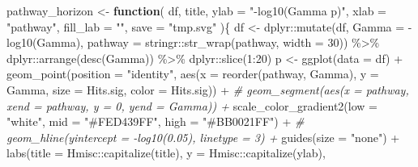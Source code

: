 \documentclass[
]{article}
\newenvironment{Shaded}{\begin{snugshade}}{\end{snugshade}}
\newcommand{\AttributeTok}[1]{\textcolor[rgb]{0.77,0.63,0.00}{#1}}
\newcommand{\CommentTok}[1]{\textcolor[rgb]{0.56,0.35,0.01}{\textit{#1}}}
\newcommand{\ControlFlowTok}[1]{\textcolor[rgb]{0.13,0.29,0.53}{\textbf{#1}}}
\newcommand{\DecValTok}[1]{\textcolor[rgb]{0.00,0.00,0.81}{#1}}
\newcommand{\FunctionTok}[1]{\textcolor[rgb]{0.00,0.00,0.00}{#1}}
\newcommand{\NormalTok}[1]{#1}
\newcommand{\OtherTok}[1]{\textcolor[rgb]{0.56,0.35,0.01}{#1}}
\newcommand{\SpecialCharTok}[1]{\textcolor[rgb]{0.00,0.00,0.00}{#1}}
\newcommand{\StringTok}[1]{\textcolor[rgb]{0.31,0.60,0.02}{#1}}
\begin{document}
\begin{Shaded}
\begin{Highlighting}[]
\NormalTok{pathway\_horizon }\OtherTok{\textless{}{-}} 
  \ControlFlowTok{function}\NormalTok{(}
\NormalTok{           df,}
\NormalTok{           title,}
           \AttributeTok{ylab =} \StringTok{"{-}log10(Gamma p)"}\NormalTok{,}
           \AttributeTok{xlab =} \StringTok{"pathway"}\NormalTok{,}
           \AttributeTok{fill\_lab =} \StringTok{""}\NormalTok{,}
           \AttributeTok{save =} \StringTok{"tmp.svg"}
\NormalTok{           )\{}
\NormalTok{    df }\OtherTok{\textless{}{-}}\NormalTok{ dplyr}\SpecialCharTok{::}\FunctionTok{mutate}\NormalTok{(df, }\AttributeTok{Gamma =} \SpecialCharTok{{-}}\FunctionTok{log10}\NormalTok{(Gamma),}
                        \AttributeTok{pathway =}\NormalTok{ stringr}\SpecialCharTok{::}\FunctionTok{str\_wrap}\NormalTok{(pathway, }\AttributeTok{width =} \DecValTok{30}\NormalTok{)) }\SpecialCharTok{\%\textgreater{}\%} 
\NormalTok{      dplyr}\SpecialCharTok{::}\FunctionTok{arrange}\NormalTok{(}\FunctionTok{desc}\NormalTok{(Gamma)) }\SpecialCharTok{\%\textgreater{}\%} 
\NormalTok{      dplyr}\SpecialCharTok{::}\FunctionTok{slice}\NormalTok{(}\DecValTok{1}\SpecialCharTok{:}\DecValTok{20}\NormalTok{)}
\NormalTok{    p }\OtherTok{\textless{}{-}} \FunctionTok{ggplot}\NormalTok{(}\AttributeTok{data =}\NormalTok{ df) }\SpecialCharTok{+}
      \FunctionTok{geom\_point}\NormalTok{(}\AttributeTok{position =} \StringTok{"identity"}\NormalTok{,}
                 \FunctionTok{aes}\NormalTok{(}\AttributeTok{x =} \FunctionTok{reorder}\NormalTok{(pathway, Gamma),}
                     \AttributeTok{y =}\NormalTok{ Gamma,}
                     \AttributeTok{size =}\NormalTok{ Hits.sig,}
                     \AttributeTok{color =}\NormalTok{ Hits.sig)) }\SpecialCharTok{+}
      \CommentTok{\# geom\_segment(aes(x = pathway, xend = pathway, y = 0, yend = Gamma)) +}
      \FunctionTok{scale\_color\_gradient2}\NormalTok{(}\AttributeTok{low =} \StringTok{"white"}\NormalTok{, }\AttributeTok{mid =} \StringTok{"\#FED439FF"}\NormalTok{, }\AttributeTok{high =} \StringTok{"\#BB0021FF"}\NormalTok{) }\SpecialCharTok{+}
      \CommentTok{\# geom\_hline(yintercept = {-}log10(0.05), linetype = 3) +}
      \FunctionTok{guides}\NormalTok{(}\AttributeTok{size =} \StringTok{"none"}\NormalTok{) }\SpecialCharTok{+}
      \FunctionTok{labs}\NormalTok{(}\AttributeTok{title =}\NormalTok{ Hmisc}\SpecialCharTok{::}\FunctionTok{capitalize}\NormalTok{(title),}
           \AttributeTok{y =}\NormalTok{ Hmisc}\SpecialCharTok{::}\FunctionTok{capitalize}\NormalTok{(ylab),}

\end{Highlighting}
\end{Shaded}
\end{document}
